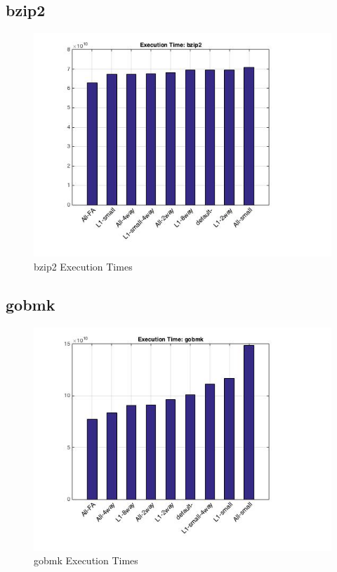 \documentclass[11pt,titlepage]{article}
\begin{document}
    \subsection{bzip2}
        \begin{figure}[H]
            \centering
            \includegraphics[scale=0.75]{etbzip2}
            \caption{bzip2 Execution Times}
            \label{fig:etbzip2}
        \end{figure}

    \subsection{gobmk}
        \begin{figure}[H]
            \centering
            \includegraphics[scale=0.75]{etgobmk}
            \caption{gobmk Execution Times}
            \label{fig:etgobmk}
        \end{figure}
\end{document}
